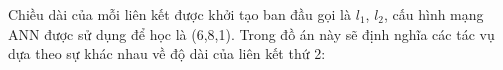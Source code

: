 Chiều dài của mỗi liên kết được khởi tạo ban đầu gọi là $l_1$, $l_2$, cấu hình mạng ANN được sử dụng để học là (6,8,1). Trong đồ án này sẽ định nghĩa các tác vụ dựa theo sự khác nhau về độ dài của liên kết thứ 2:
\begin{table} [H]
    \begin{center}
    \caption{Danh sách các tác vụ thực nghiệm bài toán Acrobot}
    \end{center}
    \label{tab:result:flappybird}
\end{table}

